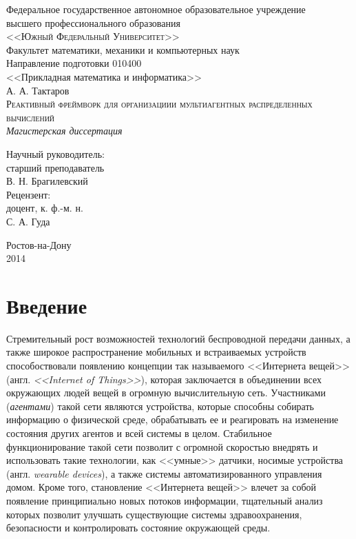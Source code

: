 \documentclass[a4paper,14pt,href]{article}
\begin{document}
\thispagestyle{empty}
\begin{center}
Федеральное государственное автономное образовательное учреждение \\
высшего профессионального образования \\
\textsc{<<Южный Федеральный Университет>>}\\[1.0cm]

Факультет математики, механики и компьютерных наук\\[1.0cm]

Направление подготовки 010400 \\
<<Прикладная математика и информатика>>\\[3cm]

А. А. Тактаров \\[1.0cm]
\textsc{Реактивный фреймворк для организациии мультиагентных распределенных вычислений}\\[1.0cm]

\textit{Магистерская диссертация}\\[2.0cm]

\begin{flushright}
    Научный руководитель: \\
    старший преподаватель \\
    В. Н. Брагилевский \\[1.0cm]

    Рецензент: \\
    доцент, к. ф.-м. н.\\
    С. А. Гуда
\end{flushright}

\vfill

  Ростов-на-Дону\\
  2014
\end{center}

\newpage
\tableofcontents

\newpage
\section*{Введение}

Стремительный рост возможностей технологий беспроводной передачи данных, а также широкое распространение мобильных и встраиваемых устройств
способоствовали появлению концепции так называемого <<Интернета вещей>> (англ. \textit{<<Internet of Things>>})\cite{IoTWired}, которая заключается в объединении всех окружающих людей вещей в огромную вычислительную сеть. Участниками (\textit{агентами}) такой сети являются устройства, которые способны собирать информацию о физической среде, обрабатывать ее и реагировать на изменение состояния других агентов и всей системы в целом. Стабильное функционирование такой сети позволит с огромной скоростью внедрять и использовать такие технологии, как <<умные>> датчики\cite{NestThermostat}, носимые устройства (англ. \textit{wearable devices}), а также системы автоматизированного управления домом. Кроме того, становление <<Интернета вещей>> влечет за собой появление принципиально новых потоков информации, тщательный анализ которых позволит улучшать существующие системы здравоохранения, безопасности и контролировать состояние окружающей среды.
\end{document}
